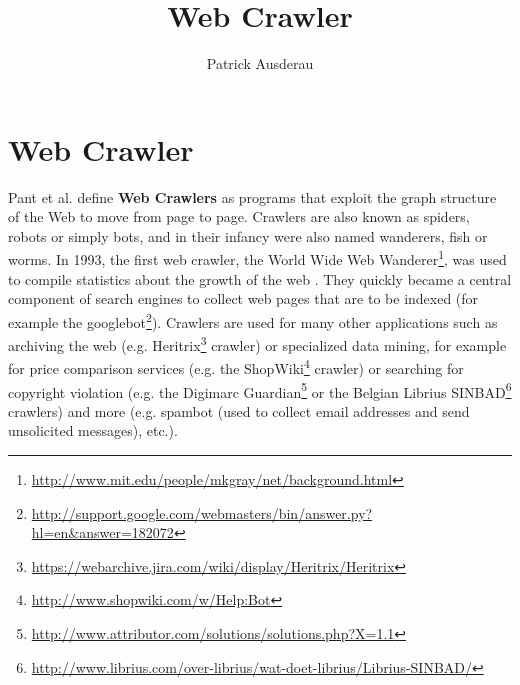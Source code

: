 \documentclass[11pt,a4paper]{article}
\author{Patrick Ausderau}
\title{Web Crawler}
\begin{document}
\section*{Web Crawler}
Pant et al. \cite{inweb:crawling} define \textbf{Web Crawlers} as programs that exploit the graph structure of the Web to
move from page to page. Crawlers are also known as spiders, robots or simply bots, and in their infancy were also named wanderers, fish or worms. In 1993, the first web crawler, the World Wide Web Wanderer\footnote{\url{http://www.mit.edu/people/mkgray/net/background.html}}, was used to compile statistics about the growth of the web \cite{naj:crawl}. They quickly became a central component of search engines to collect web pages that are to be indexed (for example the googlebot\footnote{\url{http://support.google.com/webmasters/bin/answer.py?hl=en&answer=182072}}). Crawlers are used for many other applications such as archiving the web (e.g. Heritrix\footnote{\url{https://webarchive.jira.com/wiki/display/Heritrix/Heritrix}} crawler) or specialized data mining, for example for price comparison services (e.g. the ShopWiki\footnote{\url{http://www.shopwiki.com/w/Help:Bot}} crawler) or searching for copyright violation (e.g. the Digimarc Guardian\footnote{\url{http://www.attributor.com/solutions/solutions.php?X=1.1}} or the Belgian Librius SINBAD\footnote{\url{http://www.librius.com/over-librius/wat-doet-librius/Librius-SINBAD/}} crawlers) and more (e.g. spambot (used to collect email addresses and send unsolicited messages), etc.). 
\end{document}
